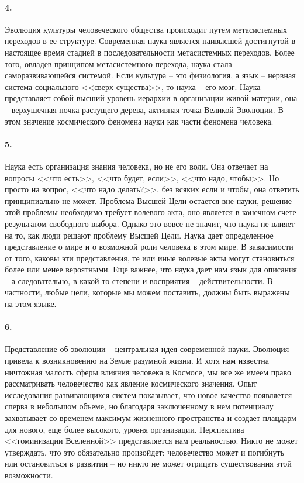 \documentclass{book}
\begin{document}
\paragraph{4.} Эволюция культуры человеческого общества происходит путем метасистемных переходов в ее структуре. Современная наука является наивысшей достигнутой в настоящее время стадией в последовательности метасистемных переходов. Более того, овладев принципом метасистемного перехода, наука стала саморазвивающейся системой. Если культура -- это физиология, а язык -- нервная система социального <<сверх‑существа>>, то наука -- его мозг. Наука представляет собой высший уровень иерархии в организации живой материи, она -- верхушечная почка растущего дерева, активная точка Великой Эволю­ции. В этом значение космического феномена науки как части феномена человека.

\paragraph{5.} Наука есть организация знания человека, но не его воли. Она отвечает на вопросы <<что есть>>, <<что будет, если>>, <<что надо, чтобы>>. Но просто на вопрос, <<что надо делать?>>, без всяких если и чтобы, она ответить принципиально не может. Проблема Высшей Цели остается вне науки, решение этой проблемы необ­ходимо требует волевого акта, оно является в конечном счете результатом свободного выбора.
Однако это вовсе не значит, что наука не влияет на то, как люди решают проблему Высшей Цели. Наука дает определенное представление о мире и о возможной роли человека в этом мире. В зависимости от того, каковы эти представления, те или иные волевые акты могут становиться более или менее ве­роятными. Еще важнее, что наука дает нам язык для описания -- а следовательно, в какой‑то степени и восприятия -- действительности. В частности, любые цели, которые мы можем поста­вить, должны быть выражены на этом языке.

\paragraph{6.} Представление об эволюции -- центральная идея современной науки. Эволюция привела к возникновению на Земле разумной жизни. И хотя нам известна ничтожная малость сферы влияния человека в Космосе, мы все же имеем право рассматривать человечество как явление космического значения. Опыт исследования развивающихся систем показывает, что новое качество появляется сперва в небольшом объеме, но благодаря заключенному в нем потенциалу захватывает со временем максимум жизненного пространства и создает плацдарм для нового, еще более высокого, уровня организации. Перспектива <<гоминизации Вселенной>> представляется нам реальностью. Никто не может утверждать, что это обязательно произойдет: человечество может и погибнуть или остановиться в развитии -- но никто не может отрицать существования этой возможности.
\end{document}
